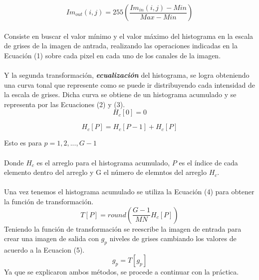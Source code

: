 \documentclass[conference]{IEEEtran}
\begin{document}
\begin{equation}
	Im_{out}(i,j) = 255\left(\frac{Im_{in}(i,j)-Min}{Max-Min}\right)
\end{equation}
\\
Consiste en buscar el valor m\'inimo y el valor m\'aximo del histograma en la escala de grises de la imagen de antrada, realizando las operaciones indicadas en la Ecuaci\'on (1) sobre cada pixel en cada uno de los canales de la imagen.\\\\
Y la segunda transformaci\'on, \textbf{\emph{ecualizaci\'on}} del histograma, se logra obteniendo una curva tonal que represente como se puede ir distribuyendo cada intensidad de la escala de grises. Dicha curva se obtiene de un histograma acumulado y se representa por las Ecuaciones (2) y (3).\\
\begin{equation}
	H_{c}[0] = 0
\end{equation}

\begin{equation}
	H_{c}[P] = 	H_{c}[P-1]+	H_{c}[P]
\end{equation}

Esto es para $p=1,2,...,G-1$\\\\
Donde $H_c$ es el arreglo para el histograma acumulado, $P$ es el \'indice de cada elemento dentro del arreglo y G el n\'umero de elemntos del arreglo $H_c$.\\\\
Una vez tenemos el histograma acumulado  se utiliza la Ecuaci\'on (4) para obtener la funci\'on de transformaci\'on.\\
\begin{equation}
	T[P] = round\left( \frac{G-1}{MN}H_{c}[P]\right)
\end{equation}
Teniendo la funci\'on de transformaci\'on se reescribe la imagen de entrada para crear una imagen de salida con $g_p$ niveles de grises cambiando los valores de acuerdo a la Ecuacion (5).
\begin{equation}
	g_p = T[g_p]
\end{equation}
Ya que se explicaron ambos m\'etodos, se procede a continuar con la pr\'actica.\\
\end{document}
